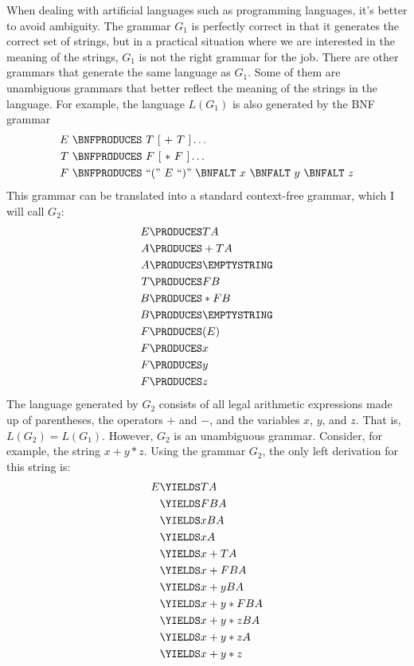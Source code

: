 When dealing with artificial languages such as programming languages,
it's better to avoid ambiguity.
The grammar $G_1$ is perfectly correct in that it generates the correct
set of strings, but in a practical situation where we are interested
in the meaning of the strings, $G_1$ is not the right grammar for
the job.  There are other grammars that generate the same language
as $G_1$.  Some of them are unambiguous grammars that better reflect
the meaning of the strings in the language.  For example, the
language $L(G_1)$ is also generated by the BNF grammar
\begin{align*}
   E\ &\BNFPRODUCES\ T\ [\ +\ T\ ]\dots\\
   T\ &\BNFPRODUCES\ F\ [\ *\ F\ ]\dots\\
   F\ &\BNFPRODUCES\ \text{``(''}\ E\ \text{``)''}\ \BNFALT\ x\ \BNFALT\ y\ \BNFALT\ z
\end{align*} 
This grammar can be translated into a standard context-free grammar, which
I will call $G_2$:
\begin{align*}
   E &\PRODUCES TA\\
   A &\PRODUCES +TA\\
   A &\PRODUCES \EMPTYSTRING\\
   T &\PRODUCES FB\\
   B &\PRODUCES *FB\\
   B &\PRODUCES \EMPTYSTRING\\
   F &\PRODUCES (E)\\
   F &\PRODUCES x\\
   F &\PRODUCES y\\
   F &\PRODUCES z
\end{align*}
The language generated by
$G_2$ consists of all legal arithmetic expressions made up of 
parentheses, the operators $+$ and $-$, and the variables $x$, $y$,
and $z$.  That is, $L(G_2)=L(G_1)$.  However, $G_2$ is an unambiguous
grammar.  Consider, for example, the string $x+y*z$.  Using the
grammar $G_2$, the only left derivation for this string is:
\begin{align*}
   E &\YIELDS TA\\
     &\YIELDS FBA\\
     &\YIELDS xBA\\
     &\YIELDS xA\\
     &\YIELDS x+TA\\
     &\YIELDS x+FBA\\
     &\YIELDS x+yBA\\
     &\YIELDS x+y*FBA\\
     &\YIELDS x+y*zBA\\
     &\YIELDS x+y*zA\\
     &\YIELDS x+y*z
\end{align*}
